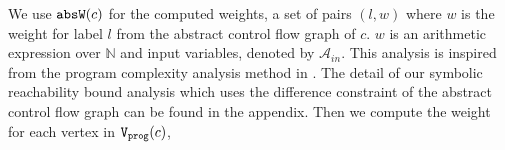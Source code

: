 %
We use $\mathtt{abs}{\mathtt{W}}(c)$ for the computed weights, 
a set of pairs 
$(l, w)$ where 
$w$ is the weight 
for label $l$ from the abstract control flow graph of $c$.
$w$ is an arithmetic  expression over $\mathbb{N}$ and
input variables, denoted by $\mathcal{A}_{in}$.
This analysis is  inspired from the program complexity analysis method in \cite{sinn2017complexity}.
The detail of our symbolic reachability bound analysis which uses the difference constraint of the abstract control flow graph can be found in the appendix.
%
%
Then we compute the weight for each vertex in $\mathtt{{V_{prog}}}(c)$,

